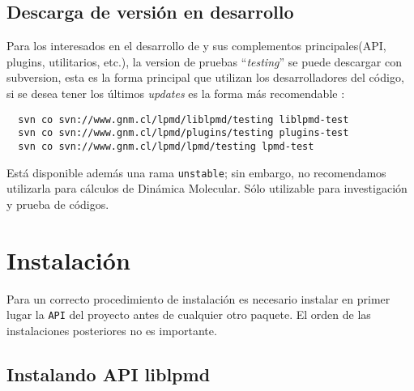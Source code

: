 \subsection{Descarga de versi\'on en desarrollo}

Para los interesados en el desarrollo de {\lpmd} y sus complementos principales(API, plugins, utilitarios, etc.), la version de pruebas ``\textit{testing}'' se puede descargar con subversion, esta es la forma principal que utilizan los desarrolladores del c\'odigo, si se desea tener los \'ultimos \textit{updates} es la forma m\'as recomendable :

\begin{center}
 \begin{verbatim}
  svn co svn://www.gnm.cl/lpmd/liblpmd/testing liblpmd-test
  svn co svn://www.gnm.cl/lpmd/plugins/testing plugins-test
  svn co svn://www.gnm.cl/lpmd/lpmd/testing lpmd-test
 \end{verbatim}
\end{center}

Est\'a disponible adem\'as una rama \verb|unstable|; sin embargo, no recomendamos utilizarla para c\'alculos de Din\'amica Molecular. S\'olo utilizable para investigaci\'on y prueba de c\'odigos.

\section{Instalaci\'on}

Para un correcto procedimiento de instalaci\'on es necesario instalar en primer lugar la \verb|API| del proyecto antes de cualquier otro paquete. El orden de las instalaciones posteriores no es importante.


\subsection{Instalando API liblpmd}

